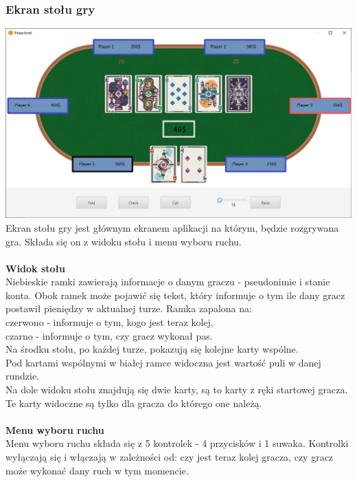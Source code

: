 \documentclass{article}
\begin{document}
        \subsubsection{Ekran stołu gry}
            \includegraphics[width=\textwidth]{gui_table.png}
            Ekran stołu gry jest głównym ekranem aplikacji na którym, będzie rozgrywana gra.
            Składa się on z widoku stołu i menu wyboru ruchu.\\
            \\
            \textbf{Widok stołu}\\
            Niebieskie ramki zawierają informacje o danym graczu - pseudonimie i stanie konta.
            Obok ramek może pojawić się tekst, który informuje o tym ile dany gracz postawił pieniędzy w aktualnej turze. Ramka zapalona na:\\
            czerwono - informuje o tym, kogo jest teraz kolej,\\
            czarno - informuje o tym, czy gracz wykonał pas.\\
            Na środku stołu, po każdej turze, pokazują się kolejne karty wspólne.\\
            Pod kartami wspólnymi w białej ramce widoczna jest wartość puli w danej rundzie.\\
            Na dole widoku stołu znajdują się dwie karty, są to karty z ręki startowej gracza. Te karty widoczne są tylko dla gracza do którego one należą.\\
            \\
            \textbf{Menu wyboru ruchu}\\
            Menu wyboru ruchu składa się z 5 kontrolek - 4 przycisków i 1 suwaka. Kontrolki wyłączają się i włączają w zależności od: czy jest teraz kolej gracza, czy gracz może wykonać dany ruch w tym momencie.\\
\end{document}
